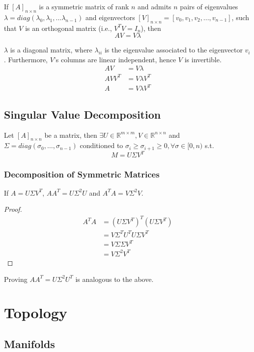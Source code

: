 If $[A]_{n\times n}$ is a symmetric matrix of rank $n$ and admits $n$ pairs of eigenvalues $\lambda = diag(\lambda_0, \lambda_1, ... \lambda_{n-1})$ and eigenvectors $[V]_{n\times n} = [v_0, v_1, v_2, ..., v_{n-1}]$, such that $V$ is an orthogonal matrix (i.e., $V^TV=I_n$), then
$$AV = V \lambda$$

$\lambda$ is a diagonal matrix, where $\lambda_{ii}$ is the eigenvalue associated to the eigenvector $v_i$ \cite{cox2001}. Furthermore, $V$'s columns are linear independent, hence $V$ is invertible.
\begin{align*}
	AV &= V \lambda \\
	AVV^T &= V \lambda V^T \\
	A &= V \lambda V^T
\end{align*}

\subsection{Singular Value Decomposition}
\label{sec:svd}
Let $[A]_{n\times n}$ be a matrix, then $\exists U \in \mathbb{R}^{m \times m}, V \in \mathbb{R}^{n \times n}$ and $\Sigma =  diag(\sigma_0, \dots, \sigma_{n-1})$ conditioned to $\sigma_i \ge \sigma_{i+1} \ge 0, \forall \sigma \in [0, n)$ s.t. \cite{gan2008}
$$M = U\Sigma V^T$$

\subsubsection{Decomposition of Symmetric Matrices}
	\label{th:svd-aat}
	If $A = U \Sigma V^T$, $AA^T = U \Sigma^2 U$ and $A^TA = V \Sigma^2 V$.
\begin{proof}
	\begin{align*}
	A^TA &= (U\Sigma V^T)^T(U\Sigma V^T) \\
	&= V \Sigma^T U^T U \Sigma V^T \\
	&= V \Sigma \Sigma V^T \\
	&= V \Sigma^2 V^T
	\end{align*}
\end{proof}

Proving $AA^T = U \Sigma^2 U^T$ is analogous to the above.

\section{Topology}
\subsection{Manifolds}

